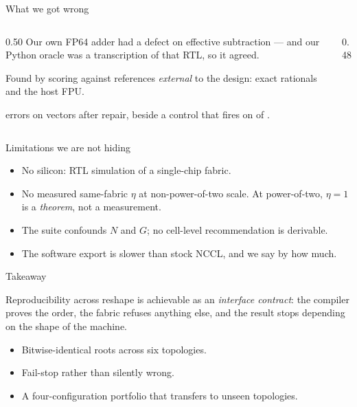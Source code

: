 \documentclass[aspectratio=169,10pt]{beamer}
\begin{document}
\begin{frame}{What we got wrong}
\begin{columns}[T]
\begin{column}{0.50\textwidth}\small
Our own FP64 adder had a defect on effective subtraction --- and our Python
oracle was a transcription of that RTL, so it agreed.

\vspace{4pt}
Found by scoring against references \emph{external} to the design: exact
rationals and the host FPU.

\vspace{4pt}
\FpAcceptErrors{} errors on \FpAcceptVectors{} vectors after repair, beside a
control that fires on \FpCtrlErrors{} of \FpCtrlVectors{}.
\end{column}
\begin{column}{0.48\textwidth}
\end{column}
\end{columns}
\end{frame}

\begin{frame}{Limitations we are not hiding}
\begin{itemize}
  \item No silicon: RTL simulation of a single-chip fabric.
  \item No measured same-fabric $\eta$ at non-power-of-two scale. At
        power-of-two, $\eta = 1$ is a \emph{theorem}, not a measurement.
  \item The suite confounds $N$ and $G$; no cell-level recommendation is derivable.
  \item The software export is slower than stock NCCL, and we say by how much.
\end{itemize}
\end{frame}

\begin{frame}{Takeaway}
\begin{block}{}
Reproducibility across reshape is achievable as an \emph{interface contract}:
the compiler proves the order, the fabric refuses anything else, and the
result stops depending on the shape of the machine.
\end{block}
\vspace{6pt}
\begin{itemize}
  \item Bitwise-identical roots across six topologies.
  \item Fail-stop rather than silently wrong.
  \item A four-configuration portfolio that transfers to unseen topologies.
\end{itemize}
\end{frame}
\end{document}
